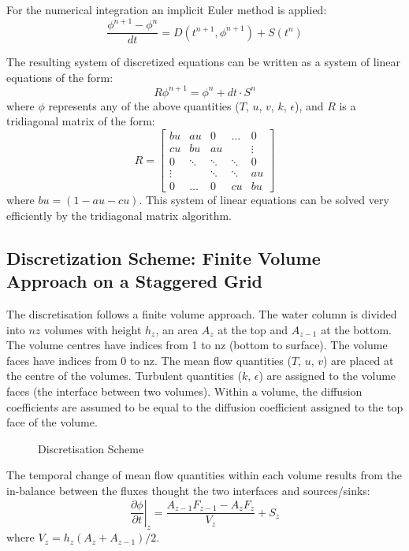 \documentclass[paper=a4, fontsize=12pt]{article}
\begin{document}
\noindent For the numerical integration an implicit Euler method is applied:
\begin{equation}
	\frac{\phi^{n+1}-\phi^n}{dt} = D(t^{n+1}, \phi^{n+1}) + S(t^{n}) 
\end{equation}

\noindent The resulting system of discretized equations can be written as a system of linear equations of the form:
\begin{equation}
	R\phi^{n+1}=\phi^n+dt\cdot S^{n}
\end{equation}
where $\phi$ represents any of the above quantities ($T$, $u$, $v$, $k$, $\epsilon$), and $R$ is a tridiagonal matrix of the form:
\begin{equation}
	R=\begin{bmatrix}
	bu		&	au		&	0		&	\hdots	&	0  \\
	cu		&	bu		&	au		&	 		&	\vdots \\
	0		&	\ddots	&	\ddots	&	\ddots	&	0 \\
	\vdots	&			&	\ddots	&	\ddots	&	au \\
	0		&	\hdots	&	0		&	cu		&	bu
	\end{bmatrix}
\end{equation}
where $bu=(1-au-cu)$. This system of linear equations can be solved very efficiently by the tridiagonal matrix algorithm.

\subsection{Discretization Scheme: Finite Volume Approach on a Staggered Grid}
The discretisation follows a finite volume approach. The water column is divided into $nz$ volumes with height $h_z$, an area $A_z$ at the top and $A_{z-1}$ at the bottom. The volume centres have indices from 1 to nz (bottom to surface). The volume faces have indices from 0 to nz. The mean flow quantities ($T$, $u$, $v$) are placed at the centre of the volumes. Turbulent quantities ($k$, $\epsilon$) are assigned to the volume faces (the interface between two volumes). Within a volume, the diffusion coefficients are assumed to be equal to the diffusion coefficient assigned to the top face of the volume.

\begin{figure}[h!]
	\centering
	\def\svgwidth{\textwidth}
	
	\caption{Discretisation Scheme}
\end{figure}

The temporal change of mean flow quantities within each volume results from the in-balance between the fluxes thought the two interfaces and sources/sinks:
\begin{equation}
	\left.\frac{\partial\phi}{\partial t}\right|_{z} = \frac{A_{z-1}F_{z-1}-A_zF_z}{V_z}+S_z
\end{equation}
where $V_z=h_z\left(A_z+A_{z-1}\right)/2$.
\end{document}
